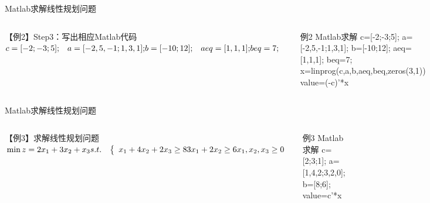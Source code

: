 \documentclass[xcolor=table,dvipsnames,svgnames,aspectratio=169,fontset=ubuntu]{ctexbeamer}
\let\\\relax
\begin{document}
\begin{frame}{Matlab求解线性规划问题}
  \begin{columns}
    【例2】Step3：写出相应Matlab代码
    \vskip 10pt
    $\begin{aligned}  &c=[-2;-3;5];\\
      &a=[-2,5,-1;1,3,1];\\ 
      &b=[-10;12];\\
      &aeq=[1,1,1];\\
      &beq=7;\\
    \end{aligned}$   
    \begin{alertblock}{例2 Matlab求解}
      c=[-2;-3;5];\\
      a=[-2,5,-1;1,3,1]; \\
      b=[-10;12];\\
      aeq=[1,1,1];\\
      beq=7;\\
      x=linprog(c,a,b,aeq,beq,zeros(3,1))\\
      value=(-c)'*x
    \end{alertblock}
  \end{columns}
\end{frame}

\begin{frame}{Matlab求解线性规划问题}
  \begin{columns}
    【例3】求解线性规划问题
    \vskip 10pt
    $\begin{aligned} & \min z=2 x_1+3 x_2+x_3 \\ s.t. & \left\{\begin{array}{l}x_1+4 x_2+2 x_3 \geq 8 \\ 3 x_1+2 x_2 \geq 6 \\ x_1, x_2, x_3 \geq 0\end{array}\right.\end{aligned}$ 
    \begin{alertblock}{例3 Matlab求解}
      c=[2;3;1];\\
      a=[1,4,2;3,2,0];\\
      b=[8;6];\\
      \\
      value=c'*x
    \end{alertblock}  
  \end{columns}
\end{frame}
\end{document}
